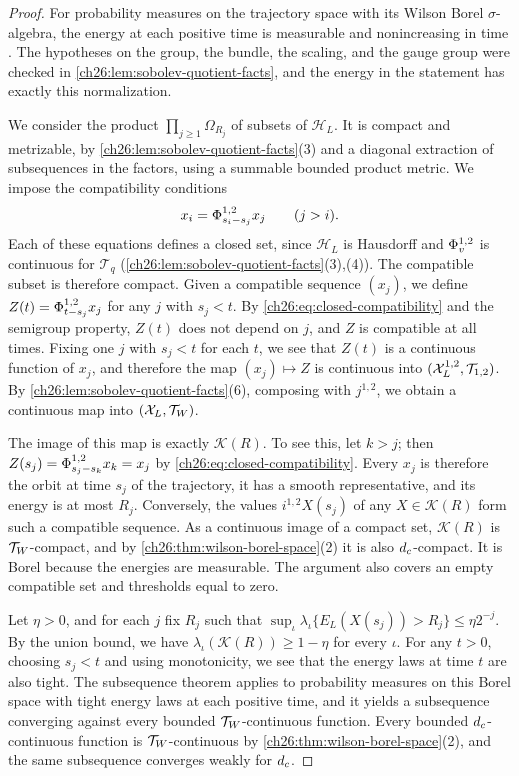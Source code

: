 \begin{proof}
For probability measures on the trajectory space with its Wilson Borel $\sigma$-algebra, the energy at each positive time is measurable and nonincreasing in time \cite[Lemma 1.5, p.~7; Lemma 4.1, p.~50]{CCState2023v4}. The hypotheses on the group, the bundle, the scaling, and the gauge group were checked in \cref{ch26:lem:sobolev-quotient-facts}, and the energy in the statement has exactly this normalization.

We consider the product $\prod_{j\ge1}\Omega_{R_j}$ of subsets of $\mathcal H_L$. It is compact and metrizable, by \cref{ch26:lem:sobolev-quotient-facts}(3) and a diagonal extraction of subsequences in the factors, using a summable bounded product metric. We impose the compatibility conditions
\begin{equation}\label{ch26:eq:closed-compatibility}
 x_i=\Phi^{1,2}_{s_i-s_j}x_j\qquad(j>i).
\end{equation}
Each of these equations defines a closed set, since $\mathcal H_L$ is Hausdorff and $\Phi^{1,2}_v$ is continuous for $\mathcal T_q$ (\cref{ch26:lem:sobolev-quotient-facts}(3),(4)). The compatible subset is therefore compact. Given a compatible sequence $(x_j)$, we define $Z(t)=\Phi^{1,2}_{t-s_j}x_j$ for any $j$ with $s_j<t$. By \eqref{ch26:eq:closed-compatibility} and the semigroup property, $Z(t)$ does not depend on $j$, and $Z$ is compatible at all times. Fixing one $j$ with $s_j<t$ for each $t$, we see that $Z(t)$ is a continuous function of $x_j$, and therefore the map $(x_j)\mapsto Z$ is continuous into $(\mathcal X_L^{1,2},\mathcal T_{1,2})$. By \cref{ch26:lem:sobolev-quotient-facts}(6), composing with $j^{1,2}$, we obtain a continuous map into $(\mathcal X_L,\mathcal T_W)$.

The image of this map is exactly $\mathcal K(R)$. To see this, let $k>j$; then $Z(s_j)=\Phi^{1,2}_{s_j-s_k}x_k=x_j$ by \eqref{ch26:eq:closed-compatibility}. Every $x_j$ is therefore the orbit at time $s_j$ of the trajectory, it has a smooth representative, and its energy is at most $R_j$. Conversely, the values $i^{1,2}X(s_j)$ of any $X\in\mathcal K(R)$ form such a compatible sequence. As a continuous image of a compact set, $\mathcal K(R)$ is $\mathcal T_W$-compact, and by \cref{ch26:thm:wilson-borel-space}(2) it is also $d_c$-compact. It is Borel because the energies are measurable. The argument also covers an empty compatible set and thresholds equal to zero.

Let $\eta>0$, and for each $j$ fix $R_j$ such that $\sup_\iota\lambda_\iota\{E_L(X(s_j))>R_j\}\le\eta2^{-j}$. By the union bound, we have $\lambda_\iota(\mathcal K(R))\ge1-\eta$ for every $\iota$. For any $t>0$, choosing $s_j<t$ and using monotonicity, we see that the energy laws at time $t$ are also tight. The subsequence theorem \cite[Theorem 1.6, p.~7]{CCState2023v4} applies to probability measures on this Borel space with tight energy laws at each positive time, and it yields a subsequence converging against every bounded $\mathcal T_W$-continuous function. Every bounded $d_c$-continuous function is $\mathcal T_W$-continuous by \cref{ch26:thm:wilson-borel-space}(2), and the same subsequence converges weakly for $d_c$.


\end{proof}
